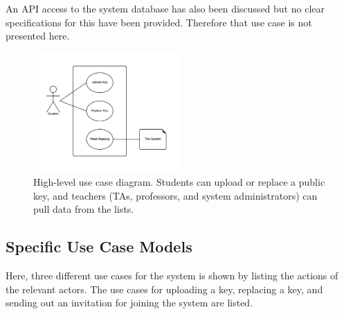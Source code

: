\documentclass[11pt,a4paper]{report}
\begin{document}
An API access to the system database has also been discussed but no clear specifications for this have been provided. Therefore that use case is not presented here.

\begin{figure}[H]
\centering
\includegraphics[width=0.5\textwidth]{pictures/use_case_pksu_del2_b_high}
\caption{High-level use case diagram. Students can upload or replace a public key, and teachers (TAs, professors, and system administrators) can pull data from the lists.}
\label{fig:use_case_diagram_high_level}
\end{figure}


\subsection{Specific Use Case Models}\label{subsec:Specific_Use_case_model}
Here, three different use cases for the system is shown by listing the actions of the relevant actors. The use cases for uploading a key, replacing a key, and sending out an invitation for joining the system are listed.
\end{document}
